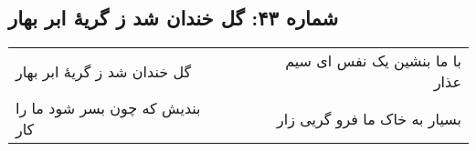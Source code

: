 \begin{center}
\section*{شماره ۴۳: گل خندان شد ز گریۀ ابر بهار}
\label{sec:043}
\begin{longtable}{l p{0.5cm} r}
گل خندان شد ز گریهٔ ابر بهار
&&
با ما بنشین یک نفس ای سیم عذار
\\
بندیش که چون بسر شود ما را کار
&&
بسیار به خاک ما فرو گریی زار
\\
\end{longtable}
\end{center}
